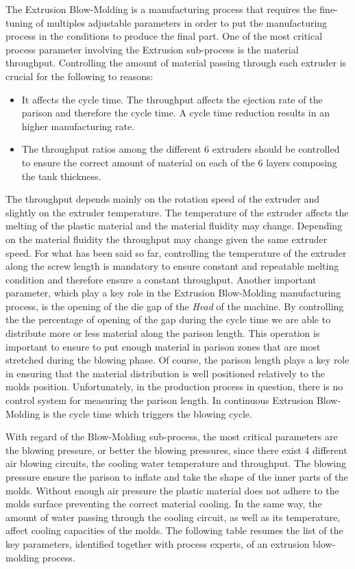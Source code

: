 The Extrusion Blow-Molding is a manufacturing process that requires the fine-tuning of multiples adjustable parameters in order to put the manufacturing process in the conditions to produce the final part. One of the most critical process parameter involving the Extrusion sub-process is the material throughput. Controlling the amount of material passing through each extruder is crucial for the following to reasons:  
%
\begin{itemize}
    \item It affects the cycle time. The throughput affects the ejection rate of the parison and therefore the cycle time. A cycle time reduction results in an higher manufacturing rate.
    \item The throughput ratios among the different 6 extruders should be controlled to ensure the correct amount of material on each of the 6 layers composing the tank thickness.
\end{itemize}
%
The throughput depends mainly on the rotation speed of the extruder and slightly on the extruder temperature. The temperature of the extruder affects the melting of the plastic material and the material fluidity may change. Depending on the material fluidity the throughput may change given the same extruder speed. For what has been said so far, controlling the temperature of the extruder along the screw length is mandatory to ensure constant and repeatable melting condition and therefore ensure a constant throughput. Another important parameter, which play a key role in the Extrusion Blow-Molding manufacturing process, is the opening of the die gap of the \textit{Head} of the machine. By controlling the the percentage of opening of the gap during the cycle time we are able to distribute more or less material along the parison length. This operation is important to ensure to put enough material in parison zones that are most stretched during the blowing phase. Of course, the parison length plays a key role in ensuring that the material distribution is well positioned relatively to the molds position. Unfortunately, in the production process in question, there is no control system for measuring the parison length. In continuous Extrusion Blow-Molding is the cycle time which triggers the blowing cycle.   

With regard of the Blow-Molding sub-process, the most critical parameters are the blowing pressure, or better the blowing pressures, since there exist 4 different air blowing circuits, the cooling water temperature and throughput. The blowing pressure ensure the parison to inflate and take the shape of the inner parts of the molds. Without enough air pressure the plastic material does not adhere to the molds surface preventing the correct material cooling. In the same way, the amount of water passing through the cooling circuit, as well as its temperature, affect cooling capacities of the molds. The following table resumes the list of the key parameters, identified together with process experts, of an extrusion blow-molding process.

